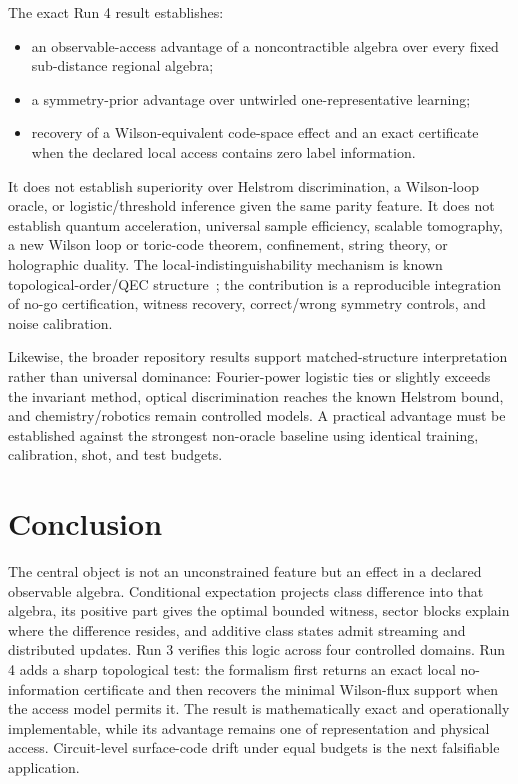 \documentclass[letterpaper,journal]{IEEEtran}
\begin{document}
The exact Run 4 result establishes:

\begin{itemize}
\item an observable-access advantage of a noncontractible algebra over every
fixed sub-distance regional algebra;
\item a symmetry-prior advantage over untwirled one-representative learning;
\item recovery of a Wilson-equivalent code-space effect and an exact
certificate when the declared local access contains zero label information.
\end{itemize}

It does not establish superiority over Helstrom discrimination, a Wilson-loop
oracle, or logistic/threshold inference given the same parity feature. It does
not establish quantum acceleration, universal sample efficiency, scalable
tomography, a new Wilson loop or toric-code theorem, confinement, string
theory, or holographic duality. The local-indistinguishability mechanism is
known topological-order/QEC structure~\cite{kitaev2003,bravyi2010}; the
contribution is a reproducible integration of no-go certification, witness
recovery, correct/wrong symmetry controls, and noise calibration.

Likewise, the broader repository results support matched-structure
interpretation rather than universal dominance: Fourier-power logistic ties
or slightly exceeds the invariant method, optical discrimination reaches the
known Helstrom bound, and chemistry/robotics remain controlled models. A
practical advantage must be established against the strongest non-oracle
baseline using identical training, calibration, shot, and test budgets.

\section{Conclusion}

The central object is not an unconstrained feature but an effect in a declared
observable algebra. Conditional expectation projects class difference into
that algebra, its positive part gives the optimal bounded witness, sector
blocks explain where the difference resides, and additive class states admit
streaming and distributed updates. Run 3 verifies this logic across four
controlled domains. Run 4 adds a sharp topological test: the formalism first
returns an exact local no-information certificate and then recovers the
minimal Wilson-flux support when the access model permits it. The result is
mathematically exact and operationally implementable, while its advantage
remains one of representation and physical access. Circuit-level
surface-code drift under equal budgets is the next falsifiable application.



\end{document}
